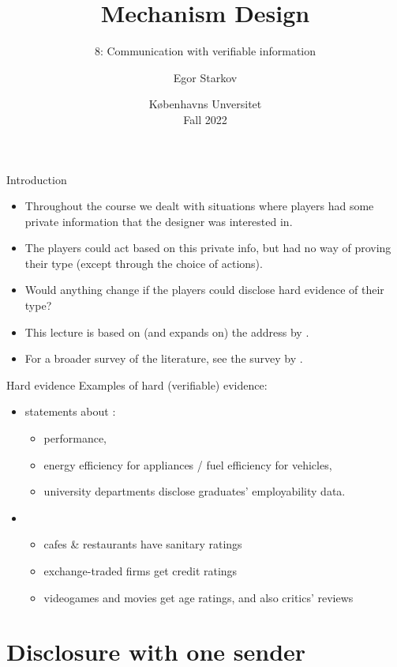 \documentclass[english,10pt
,aspectratio=169
]{beamer}
\title{Mechanism Design}
\subtitle{8: Communication with verifiable information}
\author{Egor Starkov}
\date{K{\o}benhavns Unversitet \\
	Fall 2022}
\begin{document}
	\frame[plain]{\titlepage}



\begin{frame}{Introduction}
\begin{itemize}
	\item Throughout the course we dealt with situations where players had some private information that the designer was interested in.
	\item The players could act based on this private info, but had no way of proving their type (except through the choice of actions).
	\item Would anything change if the players could \alert{disclose hard evidence} of their type?
	\item This lecture is based on (and expands on) the address by \cite{dekel_evidence_2016}.
	\item For a broader survey of the literature, see the survey by \cite{dranove_quality_2010}.
\end{itemize}
\end{frame}


\begin{frame}{Hard evidence}
	Examples of hard (verifiable) evidence:
	\begin{itemize}
		\item statements about :
		\begin{itemize}
			\item performance, 
			\item energy efficiency for appliances / fuel efficiency for vehicles,
			\item university departments disclose graduates' employability data.
		\end{itemize}
		\item {} 
		\begin{itemize}
			\item cafes \& restaurants have sanitary ratings
			\item exchange-traded firms get credit ratings
			\item videogames and movies get age ratings, and also critics' reviews
		\end{itemize}
	\end{itemize}
\end{frame}


\section{Disclosure with one sender}
\end{document}

